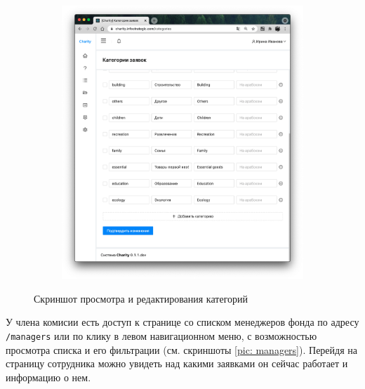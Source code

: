 \documentclass[a4paper,12pt,reqno]{article}
\begin{document}
	\begin{figure}[H]
	    \centering
		\begin{subfigure}[b]{0.475\linewidth}
			\includegraphics[width=\linewidth]{img/ro/categories.png}
		\end{subfigure}
		\caption{Скриншот просмотра и редактирования категорий}
		\label{pic: categories}
	\end{figure}
	
	У члена комисии есть доступ к странице со списком менеджеров фонда по адресу \texttt{/managers} или по клику в левом навигационном меню, с возможностью просмотра списка и его фильтрации (см. скриншоты \ref{pic: managers}). Перейдя на страницу сотрудника можно увидеть над какими заявками он сейчас работает и информацию о нем.
	
\end{document}
